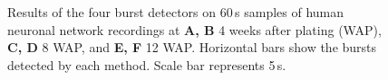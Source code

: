 \documentclass[12pt, titlepage]{article}
\begin{document}
		\begin{figure}[h]
			\centering
			\caption{Results of the four burst detectors on 60$\,$s samples of human neuronal network recordings at \textbf{A, B} 4 weeks after plating (WAP), \textbf{C, D} 8 WAP, and \textbf{E, F} 12 WAP. Horizontal bars show the bursts detected by each method. Scale bar represents 5$\,$s.}
			\label{hiPSN_examples}
		\end{figure}
\end{document}
